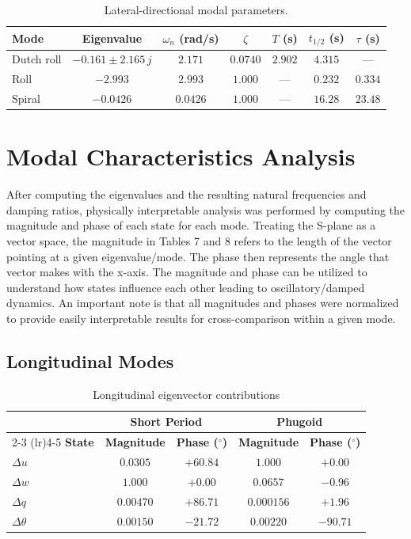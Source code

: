 \documentclass[11pt]{article}
\begin{document}
\begin{table}[h]\label{tab:table_6}
\centering
\caption{Lateral-directional modal parameters.}
\begin{tabular}{lcccccc}
\toprule
\textbf{Mode} & \textbf{Eigenvalue} & \textbf{$\omega_n$ (rad/s)} & \textbf{$\zeta$} & \textbf{$T$ (s)} & \textbf{$t_{1/2}$ (s)} & \textbf{$\tau$ (s)} \\
\midrule
Dutch roll       & $-0.161 \pm 2.165\,j$ & $2.171$  & $0.0740$ & $2.902$ & $4.315$  & ---     \\
Roll             & $-2.993$              & $2.993$  & $1.000$  & ---     & $0.232$  & $0.334$ \\
Spiral           & $-0.0426$             & $0.0426$ & $1.000$  & ---     & $16.28$  & $23.48$ \\
\bottomrule
\end{tabular}
\end{table}

\newpage

\section{Modal Characteristics Analysis}

After computing the eigenvalues and the resulting natural frequencies and damping ratios, physically interpretable
analysis was performed by computing the magnitude and phase of each state for each mode.
Treating the S-plane as a vector space, the magnitude in Tables 7 and 8 refers to the length of the vector pointing
at a given eigenvalue/mode.
The phase then represents the angle that vector makes with the x-axis.
The magnitude and phase can be utilized to understand how states influence each other leading to oscillatory/damped
dynamics.
An important note is that all magnitudes and phases were normalized to provide easily interpretable results for
cross-comparison within a given mode.

\subsection{Longitudinal Modes}

\begin{table}[h]\label{tab:table_7}
\centering
\caption{Longitudinal eigenvector contributions}
\begin{tabular}{l cc cc}
\toprule
& \multicolumn{2}{c}{\textbf{Short Period}} & \multicolumn{2}{c}{\textbf{Phugoid}} \\
\cmidrule(lr){2-3} \cmidrule(lr){4-5}
\textbf{State} & \textbf{Magnitude} & \textbf{Phase ($^\circ$)} & \textbf{Magnitude} & \textbf{Phase ($^\circ$)} \\
\midrule
$\Delta u$       & $0.0305$  & $+60.84$  & $1.000$    & $+0.00$   \\
$\Delta w$       & $1.000$   & $+0.00$   & $0.0657$   & $-0.96$   \\
$\Delta q$       & $0.00470$ & $+86.71$  & $0.000156$ & $+1.96$   \\
$\Delta\theta$   & $0.00150$ & $-21.72$  & $0.00220$  & $-90.71$  \\
\bottomrule
\end{tabular}
\end{table}
\end{document}

